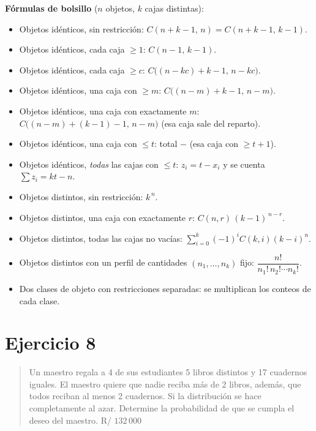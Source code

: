 \documentclass[11pt]{article}
\begin{document}
\begin{tip}
\textbf{Fórmulas de bolsillo} ($n$ objetos, $k$ cajas distintas):
\begin{itemize}[leftmargin=1.2cm]
  \item Objetos idénticos, sin restricción: $C(n+k-1,\,n)=C(n+k-1,\,k-1)$.
  \item Objetos idénticos, cada caja $\ge 1$: $C(n-1,\,k-1)$.
  \item Objetos idénticos, cada caja $\ge c$: $C\bigl((n-kc)+k-1,\,n-kc\bigr)$.
  \item Objetos idénticos, una caja con $\ge m$: $C\bigl((n-m)+k-1,\,n-m\bigr)$.
  \item Objetos idénticos, una caja con exactamente $m$: $C\bigl((n-m)+(k-1)-1,\,n-m\bigr)$ (esa caja sale del reparto).
  \item Objetos idénticos, una caja con $\le t$: total $-$ (esa caja con $\ge t+1$).
  \item Objetos idénticos, \emph{todas} las cajas con $\le t$: $z_i=t-x_i$ y se cuenta $\sum z_i=kt-n$.
  \item Objetos distintos, sin restricción: $k^{\,n}$.
  \item Objetos distintos, una caja con exactamente $r$: $C(n,r)\,(k-1)^{\,n-r}$.
  \item Objetos distintos, todas las cajas no vacías: $\sum_{i=0}^{k}(-1)^i C(k,i)(k-i)^n$.
  \item Objetos distintos con un perfil de cantidades $(n_1,\ldots,n_k)$ fijo: $\dfrac{n!}{n_1!\,n_2!\cdots n_k!}$.
  \item Dos clases de objeto con restricciones separadas: se multiplican los conteos de cada clase.
\end{itemize}
\end{tip}

\section*{Ejercicio 8}

\begin{quote}
Un maestro regala a 4 de sus estudiantes 5 libros distintos y 17 cuadernos iguales. El maestro quiere que nadie reciba más de 2 libros, además, que todos reciban al menos 2 cuadernos. Si la distribución se hace completamente al azar. Determine la probabilidad de que se cumpla el deseo del maestro. \hfill R/ $132\,000$
\end{quote}
\end{document}
